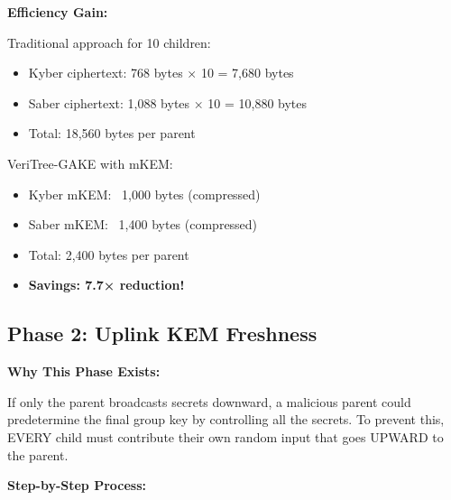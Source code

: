 \documentclass[12pt,a4paper]{report}
\begin{document}
\textbf{Efficiency Gain:}

Traditional approach for 10 children:
\begin{itemize}
\item Kyber ciphertext: 768 bytes × 10 = 7,680 bytes
\item Saber ciphertext: 1,088 bytes × 10 = 10,880 bytes
\item Total: 18,560 bytes per parent
\end{itemize}

VeriTree-GAKE with mKEM:
\begin{itemize}
\item Kyber mKEM: ~1,000 bytes (compressed)
\item Saber mKEM: ~1,400 bytes (compressed)
\item Total: 2,400 bytes per parent
\item \textbf{Savings: 7.7× reduction!}
\end{itemize}

\subsection{Phase 2: Uplink KEM Freshness}

\textbf{Why This Phase Exists:}

If only the parent broadcasts secrets downward, a malicious parent could predetermine the final group key by controlling all the secrets. To prevent this, EVERY child must contribute their own random input that goes UPWARD to the parent.

\textbf{Step-by-Step Process:}
\end{document}
